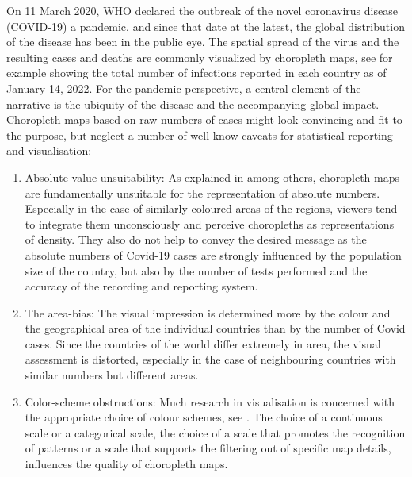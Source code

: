 \documentclass[article]{jdssv}\usepackage[]{graphicx}\usepackage[]{color}
\begin{document}
On 11 March 2020, WHO declared the outbreak of the novel coronavirus disease (COVID-19) a pandemic, and since that date at the latest, the global distribution of the disease has been in the public eye. The spatial spread of the virus and the resulting cases and deaths are commonly visualized by choropleth maps, see for example  showing the total number of infections reported in each country as of January 14, 2022. For the pandemic perspective, a central element of the narrative is the ubiquity of the disease and the accompanying global impact. Choropleth maps based on raw numbers of cases might look convincing and fit to the purpose, but neglect a number of well-know caveats for statistical reporting and visualisation:
\begin{enumerate}
\item Absolute value unsuitability: As explained in \citep{monmonier2005, slocum2008, speckmann2010} among others, choropleth maps are fundamentally unsuitable for the representation of absolute numbers. Especially in the case of similarly coloured areas of the regions, viewers tend to integrate them unconsciously and perceive choropleths as representations of density. They also do not help to convey the desired message as the absolute numbers of Covid-19 cases are strongly influenced by the population size of the country, but also by the number of tests performed and the accuracy of the recording and reporting system.
\item The area-bias: The visual impression is determined more by the colour and the geographical area of the individual countries than by the number of Covid cases. Since the countries of the world differ extremely in area, the visual assessment is distorted, especially in the case of neighbouring countries with similar numbers but different areas.
\item Color-scheme obstructions: Much research in visualisation is concerned with the appropriate choice of colour schemes, see \citep{brewer1997}. The choice of a continuous scale or a categorical scale, the choice of a scale that promotes the recognition of patterns or a scale that supports the filtering out of specific map details, influences the quality of choropleth maps.  
\end{enumerate}
\end{document}

